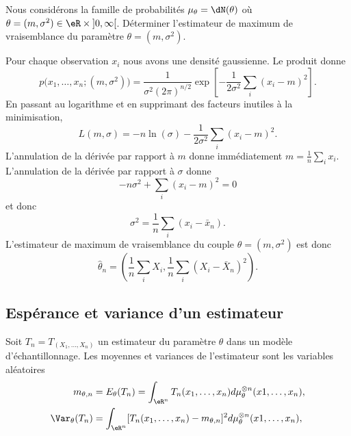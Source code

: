 \begin{example}
    Nous considérons la famille de probabilités \( \mu_{\theta}=\dN(\theta)\) où \( \theta=(m,\sigma^2)\in\eR\times\mathopen] 0 , \infty \mathclose[\). Déterminer l'estimateur de maximum de vraisemblance du paramètre \( \theta=(m,\sigma^2)\).
    
    Pour chaque observation \( x_i\) nous avons une densité gaussienne. Le produit donne
    \begin{equation}
        p\big( x_1,\ldots,x_n;(m,\sigma^2) \big)=\frac{1}{ \sigma^2(2\pi)^{n/2} }\exp\left[ -\frac{1}{ 2\sigma^2 }\sum_i(x_i-m)^2 \right].
    \end{equation}
    En passant au logarithme et en supprimant des facteurs inutiles à la minimisation,
    \begin{equation}
        L(m,\sigma)=-n\ln(\sigma)-\frac{1}{ 2\sigma^2 }\sum_i(x_i-m)^2.
    \end{equation}
    L'annulation de la dérivée par rapport à \( m\) donne immédiatement \( m=\frac{1}{ n }\sum_i x_i\). L'annulation de la dérivée par rapport à \( \sigma\) donne
    \begin{equation}
        -n\sigma^2+\sum_i(x_i-m)^2=0
    \end{equation}
    et donc
    \begin{equation}
        \sigma^2=\frac{1}{ n }\sum_i(x_i-\bar x_n).
    \end{equation}
    L'estimateur de maximum de vraisemblance du couple \( \theta=(m,\sigma^2)\) est donc
    \begin{equation}
        \hat\theta_n=\left( \frac{1}{ n }\sum_iX_i,\frac{1}{ n }\sum_i(X_i-\bar X_n)^2 \right).
    \end{equation}
\end{example}

\subsection{Espérance et variance d'un estimateur}

Soit \( T_n=T_(X_1,\ldots,X_n)\) un estimateur du paramètre \( \theta\) dans un modèle d'échantillonnage. Les moyennes et variances de l'estimateur sont les variables aléatoires
\begin{subequations}
    \begin{align}
        m_{\theta,n}&=E_{\theta}(T_n)=\int_{\eR^n}T_n(x_1,\ldots,x_n)d\mu_{\theta}^{\otimes n}(x1,\ldots,x_n),\\
        \Var_{\theta}(T_n)&=\int_{\eR^n}[T_n(x_1,\ldots,x_n)-m_{\theta,n}]^2d\mu_{\theta}^{\otimes n}(x1,\ldots,x_n),
    \end{align}
\end{subequations}

